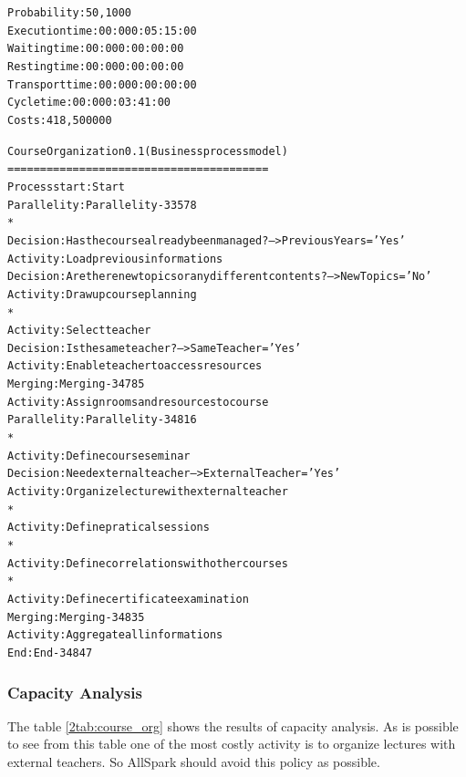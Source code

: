 \begin{alltt}
Probability:   50,1000%
Execution time:  00:000:05:15:00
Waiting time:  00:000:00:00:00
Resting time:  00:000:00:00:00
Transport time:  00:000:00:00:00
Cycle time:  00:000:03:41:00
Costs:  418,500000

Course Organization 0.1 (Business process model)
========================================
Process start: Start
Parallelity: Parallelity-33578
    *
    Decision: Has the course already been managed? --> PreviousYears = 'Yes'
    Activity: Load previous informations
    Decision: Are there new topics or any different contents? --> NewTopics = 'No'
    Activity: Draw up course planning
    *
    Activity: Select teacher
    Decision: Is the same teacher? --> SameTeacher = 'Yes'
    Activity: Enable teacher to access resources
Merging: Merging-34785
Activity: Assign rooms and resources to course
Parallelity: Parallelity-34816
    *
    Activity: Define course seminar
    Decision: Need external teacher --> ExternalTeacher = 'Yes'
    Activity: Organize lecture with external teacher
    *
    Activity: Define pratical sessions
    *
    Activity: Define correlations with other courses
    *
    Activity: Define certificate examination
Merging: Merging-34835
Activity: Aggregate all informations
End: End-34847
\end{alltt}

\subsubsection{Capacity Analysis}
The table \ref{2tab:course_org} shows the results of capacity analysis.
As is possible to see from this table one of the most costly activity is
to organize lectures with external teachers. So AllSpark should avoid this
policy as possible.


